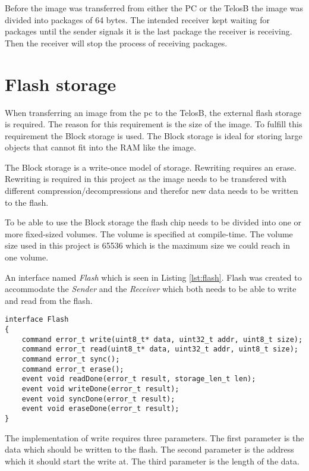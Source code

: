 Before the image was transferred from either the PC or the TelosB the image was divided into packages of 64 bytes. The intended receiver kept waiting for packages until the sender signals it is the last package the receiver is receiving. Then the receiver will stop the process of receiving packages. 


\section{Flash storage}

When transferring an image from the pc to the TelosB, the external flash storage is required. The reason for this requirement is the size of the image. To fulfill this requirement the Block storage is used. The Block storage is ideal for storing large objects that cannot fit into the RAM like the image.

The Block storage is a write-once model of storage. Rewriting requires an erase. Rewriting is required in this project as the image needs to be transfered with different compression/decompressions and therefor new data needs to be written to the flash.

To be able to use the Block storage the flash chip needs to be divided into one or more fixed-sized volumes. The volume is specified at compile-time. The volume size used in this project is 65536 which is the maximum size we could reach in one volume.

An interface named \emph{Flash} which is seen in Listing \ref{lst:flash}. Flash was created to accommodate the \emph{Sender} and the \emph{Receiver} which both needs to be able to write and read from the flash. 

\begin{lstlisting}[caption={The interface flash}, label=lst:flash]
interface Flash
{
	command error_t write(uint8_t* data, uint32_t addr, uint8_t size);
	command error_t read(uint8_t* data, uint32_t addr, uint8_t size);
	command error_t sync();
	command error_t erase();
	event void readDone(error_t result, storage_len_t len);
	event void writeDone(error_t result);
	event void syncDone(error_t result);
	event void eraseDone(error_t result);	
}
\end{lstlisting}

The implementation of write requires three parameters. The first parameter is the data which should be written to the flash. The second parameter is the address which it should start the write at. The third parameter is the length of the data. 

